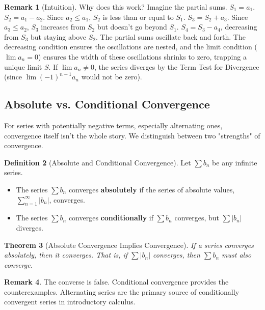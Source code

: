 \documentclass[11pt, a4paper]{article}
\theoremstyle{plain} %
\newtheorem{theorem}{Theorem}[section]
\theoremstyle{definition} %
\newtheorem{definition}[theorem]{Definition}
\newtheorem{remark}[theorem]{Remark}
\begin{document}
\begin{remark}[Intuition]
Why does this work? Imagine the partial sums. $S_1 = a_1$. $S_2 = a_1 - a_2$. Since $a_2 \le a_1$, $S_2$ is less than or equal to $S_1$. $S_3 = S_2 + a_3$. Since $a_3 \le a_2$, $S_3$ increases from $S_2$ but doesn't go beyond $S_1$. $S_4 = S_3 - a_4$, decreasing from $S_3$ but staying above $S_2$. The partial sums oscillate back and forth. The decreasing condition ensures the oscillations are nested, and the limit condition ($\lim a_n = 0$) ensures the width of these oscillations shrinks to zero, trapping a unique limit $S$.
If $\lim a_n \neq 0$, the series diverges by the Term Test for Divergence (since $\lim (-1)^{n-1}a_n$ would not be zero).
\end{remark}

\subsection{Absolute vs. Conditional Convergence}
For series with potentially negative terms, especially alternating ones, convergence itself isn't the whole story. We distinguish between two "strengths" of convergence.

\begin{definition}[Absolute and Conditional Convergence]\label{def:abs_cond_conv}
Let $\sum b_n$ be any infinite series.
\begin{itemize}
    \item The series $\sum b_n$ converges \textbf{absolutely} if the series of absolute values, $\sum_{n=1}^{\infty} |b_n|$, converges.
    \item The series $\sum b_n$ converges \textbf{conditionally} if $\sum b_n$ converges, but $\sum |b_n|$ diverges.
\end{itemize}
\end{definition}

\begin{theorem}[Absolute Convergence Implies Convergence]
If a series converges absolutely, then it converges. That is, if $\sum |b_n|$ converges, then $\sum b_n$ must also converge.
\end{theorem}

\begin{remark}
The converse is false. Conditional convergence provides the counterexamples. Alternating series are the primary source of conditionally convergent series in introductory calculus.
\end{remark}
\end{document}
